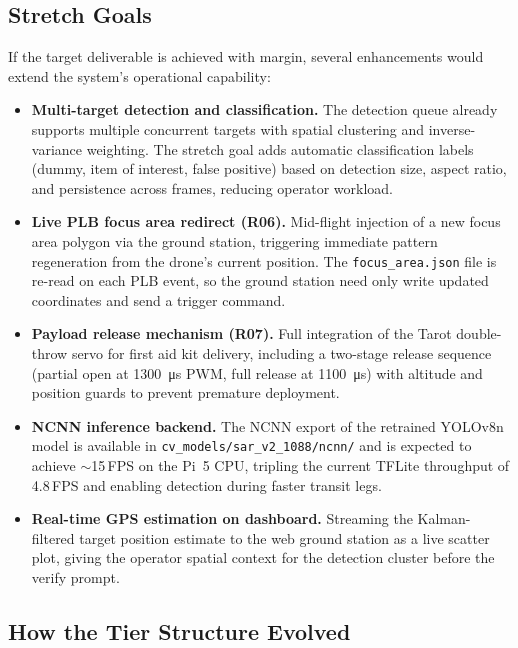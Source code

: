 \subsection{Stretch Goals}\label{sec:stretch}

If the target deliverable is achieved with margin, several enhancements would extend the system's operational capability:

\begin{itemize}
  \item \textbf{Multi-target detection and classification.} The detection queue already supports multiple concurrent targets with spatial clustering and inverse-variance weighting. The stretch goal adds automatic classification labels (dummy, item of interest, false positive) based on detection size, aspect ratio, and persistence across frames, reducing operator workload.
  \item \textbf{Live PLB focus area redirect (R06).} Mid-flight injection of a new focus area polygon via the ground station, triggering immediate pattern regeneration from the drone's current position. The \texttt{focus\_area.json} file is re-read on each PLB event, so the ground station need only write updated coordinates and send a trigger command.
  \item \textbf{Payload release mechanism (R07).} Full integration of the Tarot double-throw servo for first aid kit delivery, including a two-stage release sequence (partial open at \SI{1300}{\micro\second} PWM, full release at \SI{1100}{\micro\second}) with altitude and position guards to prevent premature deployment.
  \item \textbf{NCNN inference backend.} The NCNN export of the retrained YOLOv8n model is available in \texttt{cv\_models/\allowbreak{}sar\_v2\_1088/\allowbreak{}ncnn/} and is expected to achieve ${\sim}$15\,FPS on the Pi~5 CPU, tripling the current TFLite throughput of 4.8\,FPS and enabling detection during faster transit legs.
  \item \textbf{Real-time GPS estimation on dashboard.} Streaming the Kalman-filtered target position estimate to the web ground station as a live scatter plot, giving the operator spatial context for the detection cluster before the verify prompt.
\end{itemize}

\subsection{How the Tier Structure Evolved}\label{sec:tier-evolution}

